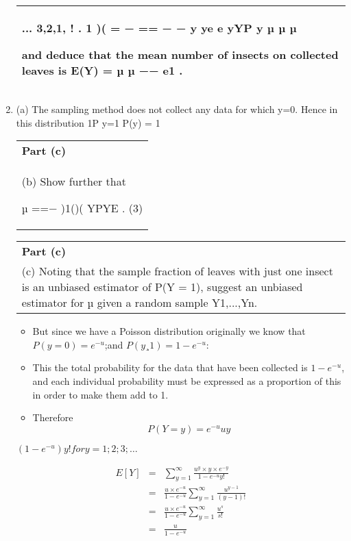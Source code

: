 \documentclass[a4paper,12pt]{article}
\begin{document}
\begin{enumerate}
\begin{table}[ht!]
\begin{tabular}{|p{15cm}|}
 ... 3,2,1, ! . 1 )( = − == − − y ye e yYP y µ µ µ
 
 
   and deduce that the mean number of insects on collected leaves is 
 E(Y) = 
µ
µ −− e1
. 
\\ \hline 
   \end{tabular}
 \end{table}
\item  (a) The sampling method does not collect any data for which y=0. Hence in this distribution
1P
y=1
P(y) = 1
\begin{table}[ht!]
  \centering
  \begin{tabular}{|p{15cm}|}
  \hline  
\noindent \textbf{Part (c)} \\
(b) Show further that 
 
 
µ
==− )1()( YPYE . 
(3) \\
\hline 
   \end{tabular}
 \end{table}

  \begin{table}[ht!]
  \centering
  \begin{tabular}{|p{15cm}|}
  \hline  
\noindent \textbf{Part (c)} \\ 
(c) Noting that the sample fraction of leaves with just one insect is an unbiased estimator of P(Y = 1), suggest an unbiased estimator for µ given a random sample Y1,...,Yn. \\
\hline 
   \end{tabular}
 \end{table}
\begin{itemize}
\item But since we have a Poisson distribution originally we know that $P(y = 0) =
e^{-u}$;and $P(y ¸ 1) = 1 - e^{-u}$:
\item This the total probability for the data that have been collected is $1-e^{-u}$, and each
individual probability must be expressed as a proportion of this in order to make
them add to 1.
\item 
Therefore \[P(Y = y) = e^{-u}uy\]
\end{itemize}

$(1-e^{-u})y! for y = 1; 2; 3; \ldots$


\begin{eqnarray*}
E[Y] &=& 
\sum^{\infty}_{y=1} \frac{u^{y} \times y \times e^{-y} }{1-e^{-u}y!}\\
&=& \frac{u\times e^{-u}}{1-e^{-u}} \sum^{\infty}_{y=1} \frac{u^{y-1} }{(y-1)!}\\
&=& \frac{u \times e^{-u}}{1-e^{-u}} \sum^{\infty}_{y=1} \frac{u^{s} }{s!}\\
&=& \frac{u}{1-e^{-u}}
\end{eqnarray*}


\end{enumerate}
\end{document}
